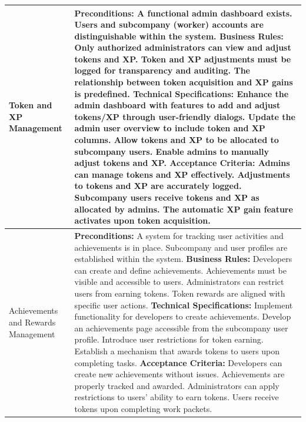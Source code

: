 \begin{longtable}{|>{\raggedright\arraybackslash}m{3cm}|>{\raggedright\arraybackslash}m{10cm}|}
    Token and XP Management &
    \textbf{Preconditions:} \newline A functional admin dashboard exists. Users and subcompany (worker) accounts are distinguishable within the system. \newline
    \textbf{Business Rules:} \newline Only authorized administrators can view and adjust tokens and XP. Token and XP adjustments must be logged for transparency and auditing. The relationship between token acquisition and XP gains is predefined. \newline
    \textbf{Technical Specifications:} \newline Enhance the admin dashboard with features to add and adjust tokens/XP through user-friendly dialogs. Update the admin user overview to include token and XP columns. Allow tokens and XP to be allocated to subcompany users. Enable admins to manually adjust tokens and XP. \newline
    \textbf{Acceptance Criteria:} \newline Admins can manage tokens and XP effectively. Adjustments to tokens and XP are accurately logged. Subcompany users receive tokens and XP as allocated by admins. The automatic XP gain feature activates upon token acquisition. \\
    \hline
    
    Achievements and Rewards Management &
    \textbf{Preconditions:} \newline A system for tracking user activities and achievements is in place. Subcompany and user profiles are established within the system. \newline
    \textbf{Business Rules:} \newline Developers can create and define achievements. Achievements must be visible and accessible to users. Administrators can restrict users from earning tokens. Token rewards are aligned with specific user actions. \newline
    \textbf{Technical Specifications:} \newline Implement functionality for developers to create achievements. Develop an achievements page accessible from the subcompany user profile. Introduce user restrictions for token earning. Establish a mechanism that awards tokens to users upon completing tasks. \newline
    \textbf{Acceptance Criteria:} \newline Developers can create new achievements without issues. Achievements are properly tracked and awarded. Administrators can apply restrictions to users' ability to earn tokens. Users receive tokens upon completing work packets. \\
    \hline

\end{longtable}



